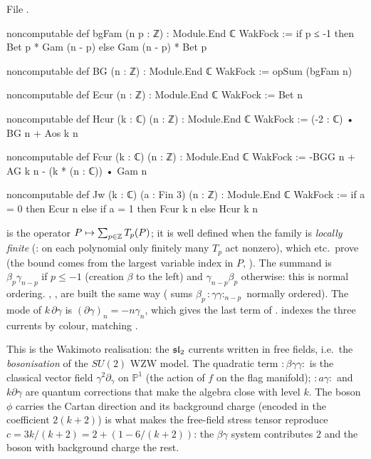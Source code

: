 \noindent File .
\begin{leancode}
noncomputable def bgFam (n p : ℤ) : Module.End ℂ WakFock :=
  if p ≤ -1 then Bet p * Gam (n - p) else Gam (n - p) * Bet p

noncomputable def BG (n : ℤ) : Module.End ℂ WakFock := opSum (bgFam n)

noncomputable def Ecur (n : ℤ) : Module.End ℂ WakFock := Bet n

noncomputable def Hcur (k : ℂ) (n : ℤ) : Module.End ℂ WakFock := (-2 : ℂ) • BG n + Aos k n

noncomputable def Fcur (k : ℂ) (n : ℤ) : Module.End ℂ WakFock :=
  -BGG n + AG k n - (k * (n : ℂ)) • Gam n

noncomputable def Jw (k : ℂ) (a : Fin 3) (n : ℤ) : Module.End ℂ WakFock :=
  if a = 0 then Ecur n else if a = 1 then Fcur k n else Hcur k n
\end{leancode}

\begin{dictionary}
 is the operator $P\mapsto\sum_{p\in{\mathbb{Z}}}T_p(P)$; it is well defined when the family is
\emph{locally finite} (: on each polynomial only finitely many $T_p$ act nonzero), which
 etc.\ prove (the bound comes from the largest variable index in $P$, ). The
summand  is $\beta_p\gamma_{n-p}$ if $p\le-1$ (creation $\beta$ to the left) and
$\gamma_{n-p}\beta_p$ otherwise: this is normal ordering. , ,  are built the
same way ( sums $\beta_p\,{:}\gamma\gamma{:}_{n-p}$ normally ordered). The mode of
$k\,\partial\gamma$ is $(\partial\gamma)_n = -n\gamma_n$, which gives the last term of . 
indexes the three currents by colour, matching .
\end{dictionary}

\begin{physics}
This is the Wakimoto realisation: the $\mathfrak{sl}_2$ currents written in free fields, i.e.\ the
\emph{bosonisation} of the $SU(2)$ WZW model. The quadratic term ${:}\beta\gamma\gamma{:}$ is the
classical vector field $\gamma^2\partial_\gamma$ on $\mathbb{P}^1$ (the action of $f$ on the flag
manifold); ${:}a\gamma{:}$ and $k\partial\gamma$ are quantum corrections that make the algebra close with
level $k$. The boson $\phi$ carries the Cartan direction and its background charge (encoded in the
coefficient $2(k+2)$) is what makes the free-field stress tensor reproduce $c = 3k/(k+2) =
2 + (1 - 6/(k+2))$: the $\beta\gamma$ system contributes $2$ and the boson with background charge the
rest.
\end{physics}

